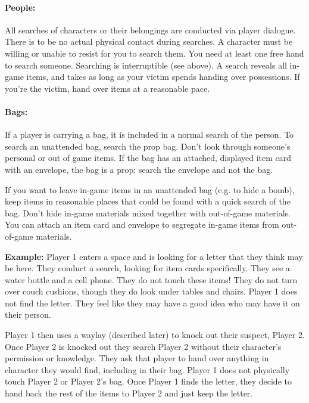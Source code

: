 \documentclass[sheet]{GL2020}
\begin{document}
\paragraph{People:} All searches of characters or their belongings are conducted via player dialogue. There is to be no actual physical contact during searches. A character must be willing or unable to resist for you to search them. You need at least one free hand to search someone. Searching is interruptible (see above). A search reveals all in-game items, and takes as long as your victim spends handing over possessions. If you're the victim, hand over items at a reasonable pace.

\paragraph{Bags:} If a player is carrying a bag, it is included in a normal search of the person. To search an unattended bag, search the prop bag. Don't look through someone's personal or out of game items. If the bag has an attached, displayed item card with an envelope, the bag is a prop; search the envelope and not the bag.

If you want to leave in-game items in an unattended bag (e.g. to hide a bomb), keep items in reasonable places that could be found with a quick search of the bag. Don't hide in-game materials mixed together with out-of-game materials. You can attach an item card and envelope to segregate in-game items from out-of-game materials.

\textbf{Example:}\newline
Player 1 enters a space and is looking for a letter that they think may be here. They conduct a search, looking for item cards specifically. They see a water bottle and a cell phone. They do not touch these items! They do not turn over couch cushions, though they do look under tables and chairs. Player 1 does not find the letter. They feel like they may have a good idea who may have it on their person.

Player 1 then uses a waylay (described later) to knock out their suspect, Player 2. Once Player 2 is knocked out they search Player 2 without their character's permission or knowledge. They ask that player to hand over anything in character they would find, including in their bag. Player 1 does not physically touch Player 2 or Player 2's bag. Once Player 1 finds the letter, they decide to hand back the rest of the items to Player 2 and just keep the letter.
\end{document}
